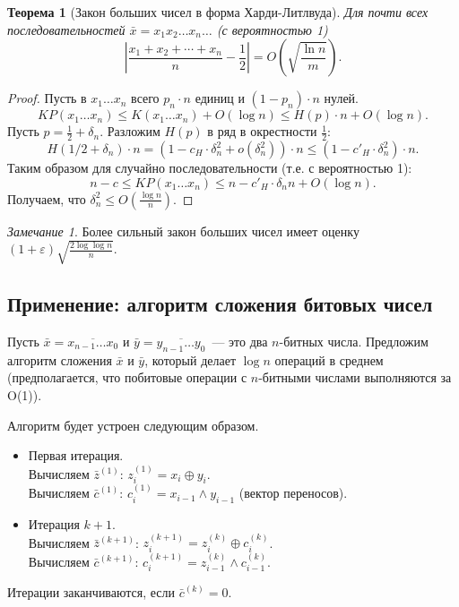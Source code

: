 \documentclass[12pt]{article}
\theoremstyle{definition}
\theoremstyle{plain}
\newtheorem{theorem}{Теорема}[section]
\theoremstyle{remark}
\newtheorem{remark}{Замечание}[section]
\begin{document}
\begin{theorem}[Закон больших чисел в форма Харди-Литлвуда]
    Для почти всех последовательностей $\bar x = x_1x_2\dotso x_n\dotso$ (с
    вероятностью 1)
    \[
        \left|\frac{x_1+x_2+\dotsb+x_n}{n} - \frac12\right| = 
        O\left(\sqrt{\frac{\ln n}{m}}\right).
    \]
\end{theorem}
\begin{proof}
    Пусть в $x_1\dotso x_n$ всего $p_n\cdot n$ единиц и $(1-p_n)\cdot n$ нулей. 
    \[
        KP(x_1\dotso x_n)\le K(x_1\dotso x_n) + O(\log n) \le 
        H(p)\cdot n + O(\log n).
    \]
    Пусть $p=\frac12 + \delta_n$. Разложим $H(p)$ в ряд в окрестности $\frac12$:
    \[
        H(1/2 + \delta_n)\cdot n = (1 - c_H\cdot\delta_n^2 + o(\delta_n^2))\cdot n
        \le(1 - c'_H\cdot\delta_n^2)\cdot n.
    \]
    Таким образом для случайно последовательности (т.е. с вероятностью 1):
    \[
        n - c \le KP(x_1\dotso x_n)\le n - c'_H\cdot\delta_nn + O(\log n).
    \]
    Получаем, что $\delta_n^2\le O\left(\frac{\log n}{n}\right)$.
\end{proof}
\begin{remark}
    Более сильный закон больших чисел имеет оценку
    $(1+\varepsilon)\sqrt{\frac{2\log\log n}{n}}$.
\end{remark}

\subsection{Применение: алгоритм сложения битовых чисел}
Пусть $\bar x=\overline{x_{n-1}\dotso x_0}$ и $\bar y = \overline{y_{n-1}\dotso y_0}$~---
это два $n$-битных числа.  Предложим алгоритм сложения $\bar x$ и $\bar y$, который делает
$\log n$ операций в среднем (предполагается, что побитовые операции с
$n$-битными числами выполняются за O(1)).

Алгоритм будет устроен следующим образом.
\begin{itemize}
    \item Первая итерация.\\
        Вычисляем $\bar z^{(1)}$: $z_i^{(1)} = x_i \oplus y_i$.\\
        Вычисляем $\bar c^{(1)}$: $c_i^{(1)} = x_{i-1} \land  y_{i-1}$ (вектор переносов).
    \item Итерация $k+1$.\\
        Вычисляем $\bar z^{(k+1)}$: $z_i^{(k+1)} = z_i^{(k)} \oplus c_i^{(k)}$.\\
        Вычисляем $\bar c^{(k+1)}$: $c_i^{(k+1)} = z_{i-1}^{(k)} \land  c_{i-1}^{(k)}$.
\end{itemize}
Итерации заканчиваются, если $\bar c^{(k)} = 0$.
\end{document}
